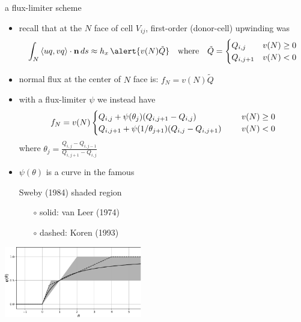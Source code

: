 \documentclass[10pt,dvipsnames,usepdftitle=false,
hyperref={pdftitle = {Finite volume methods},
    pdfauthor = {Ed Bueler}}]{beamer}
\newcommand{\bn}{\mathbf{n}}
\newcommand{\ds}{\displaystyle}
\begin{document}
\begin{frame}{a flux-limiter scheme}

\begin{itemize}
\item recall that at the $N$ face of cell $V_{ij}$, first-order (donor-cell) upwinding was
    $$\int_N \left<uq,vq\right> \cdot \bn \,ds \approx h_x\, \alert{v(N) \tilde Q} \quad \text{where} \quad \tilde Q = \begin{cases} Q_{i,j}   & v(N) \ge 0 \\
                               Q_{i,j+1} & v(N) < 0 \end{cases}$$
\item normal flux at the center of $N$ face is: \quad $f_N = v(N) \tilde Q$
\item with a flux-limiter $\psi$ we instead have
    $$f_N = v(N) \begin{cases} Q_{i,j} + \psi(\theta_j) (Q_{i,j+1}-Q_{i,j})   & v(N) \ge 0 \\
                               Q_{i,j+1} + \psi(1/\theta_{j+1}) (Q_{i,j}-Q_{i,j+1}) \hspace{5mm} & v(N) < 0 \end{cases}$$
where $\ds \theta_j = \frac{Q_{i,j}-Q_{i,j-1}}{Q_{i,j+1}-Q_{i,j}}$

\small
\item $\psi(\theta)$ is a curve in the famous

Sweby (1984) shaded region
    \begin{itemize}
    \item[$\circ$] solid: van Leer (1974)
    \item[$\circ$] dashed: Koren (1993)
    \end{itemize}
\end{itemize}

\vspace{-26mm}
\hfill \includegraphics[width=0.45\textwidth]{figs/bueler11p6}
\end{frame}
\end{document}
